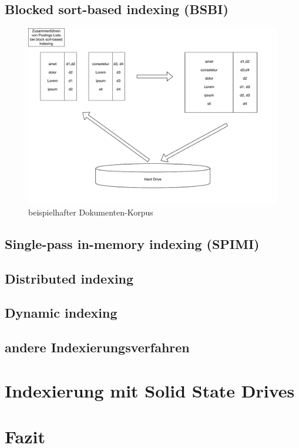 \subsection{Blocked sort-based indexing (BSBI)}
\begin{figure}
  \includegraphics[width=\textwidth]{pdf/BSI_merging.pdf}
  \caption{beispielhafter Dokumenten-Korpus}
\end{figure}

\subsection{Single-pass in-memory indexing (SPIMI)}
\subsection{Distributed indexing}
\subsection{Dynamic indexing}
\subsection{andere Indexierungsverfahren}



\section{Indexierung mit Solid State Drives} \label{indexSSD}

\section{Fazit}

